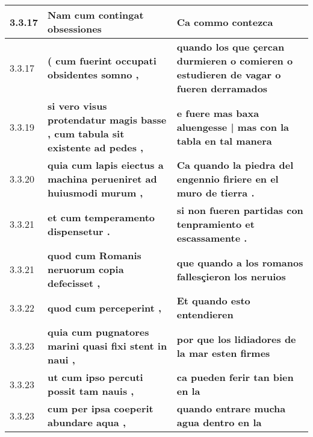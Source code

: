 \begin{tabular}{|p{1cm}|p{6.5cm}|p{6.5cm}|}
3.3.17 &  \textbf{ Nam cum contingat obsessiones }  &  \textbf{ Ca commo contezca }  \\\hline
3.3.17 &  \textbf{ ( cum fuerint occupati obsidentes somno , }  &  \textbf{ quando los que çercan durmieren o comieren o estudieren de vagar o fueren derramados }  \\\hline
3.3.19 &  \textbf{ si vero visus protendatur magis basse , cum tabula sit existente ad pedes , }  &  \textbf{ e fuere mas baxa aluengesse | mas con la tabla en tal manera }  \\\hline
3.3.20 &  \textbf{ quia cum lapis eiectus a machina perueniret ad huiusmodi murum , }  &  \textbf{ Ca quando la piedra del engennio firiere en el muro de tierra . }  \\\hline
3.3.21 &  \textbf{ et cum temperamento dispensetur . }  &  \textbf{ si non fueren partidas con tenpramiento et escassamente . }  \\\hline
3.3.21 &  \textbf{ quod cum Romanis neruorum copia defecisset , }  &  \textbf{ que quando a los romanos fallesçieron los neruios }  \\\hline
3.3.22 &  \textbf{ quod cum perceperint , }  &  \textbf{ Et quando esto entendieren }  \\\hline
3.3.23 &  \textbf{ quia cum pugnatores marini quasi fixi stent in naui , }  &  \textbf{ por que los lidiadores de la mar esten firmes }  \\\hline
3.3.23 &  \textbf{ ut cum ipso percuti possit tam nauis , }  &  \textbf{ ca pueden ferir tan bien en la }  \\\hline
3.3.23 &  \textbf{ cum per ipsa coeperit abundare aqua , }  &  \textbf{ quando entrare mucha agua dentro en la }  \\\hline

\end{tabular}
